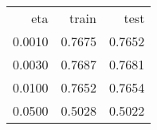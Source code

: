 \begin{tabular}{rrr}
eta & train & test \\
0.0010 & 0.7675 & 0.7652 \\
0.0030 & 0.7687 & 0.7681 \\
0.0100 & 0.7652 & 0.7654 \\
0.0500 & 0.5028 & 0.5022 \\
\end{tabular}

